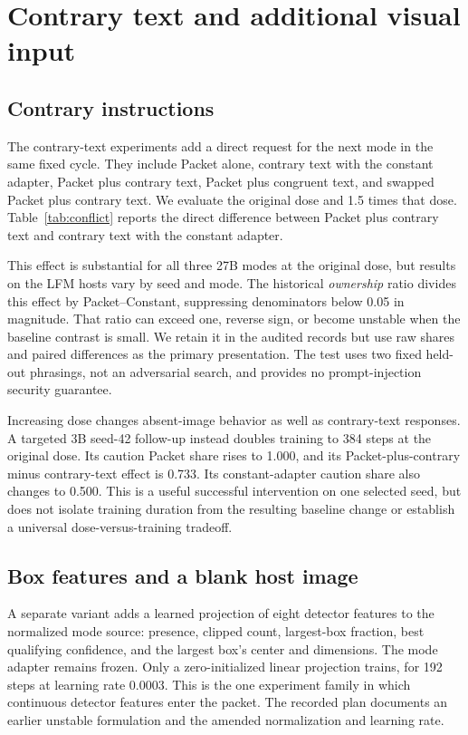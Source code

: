 \documentclass[10pt]{article}
\begin{document}
\section{Contrary text and additional visual input}
\subsection{Contrary instructions}
The contrary-text experiments add a direct request for the next mode
in the same fixed cycle. They include Packet alone, contrary text
with the constant adapter, Packet plus contrary text, Packet plus
congruent text, and swapped Packet plus contrary text. We evaluate
the original dose and 1.5 times that dose.
Table~\ref{tab:conflict} reports the direct difference between Packet
plus contrary text and contrary text with the constant adapter.

This effect is substantial for all three 27B modes at the original
dose, but results on the LFM hosts vary by seed and mode. The
historical \emph{ownership} ratio divides this effect by
Packet--Constant, suppressing denominators below 0.05 in magnitude.
That ratio can exceed one, reverse sign, or become unstable when the
baseline contrast is small. We retain it in the audited records but
use raw shares and paired differences as the primary presentation.
The test uses two fixed held-out phrasings, not an adversarial search,
and provides no prompt-injection security guarantee.

Increasing dose changes absent-image behavior as well as contrary-text
responses. A targeted 3B seed-42 follow-up instead doubles training to
384 steps at the original dose. Its caution Packet share rises to
1.000, and its Packet-plus-contrary minus contrary-text effect is
0.733. Its constant-adapter caution share also changes to 0.500.
This is a useful successful intervention on one selected seed, but
does not isolate training duration from the resulting baseline
change or establish a universal dose-versus-training tradeoff.

\subsection{Box features and a blank host image}
A separate variant adds a learned projection of eight detector
features to the normalized mode source: presence, clipped count,
largest-box fraction, best qualifying confidence, and the largest
box's center and dimensions. The mode adapter remains frozen.
Only a zero-initialized linear projection trains, for 192 steps at
learning rate 0.0003. This is the one experiment family in which
continuous detector features enter the packet. The recorded plan
documents an earlier unstable formulation and the amended
normalization and learning rate.
\end{document}
